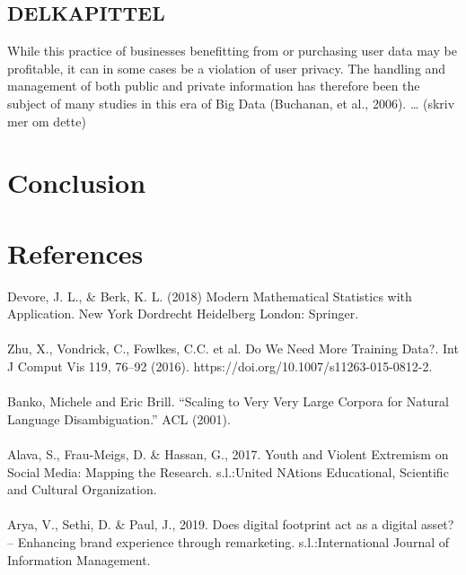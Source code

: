 \documentclass[11pt]{article}
\begin{document}
\subsection{DELKAPITTEL}
While this practice of businesses benefitting from or purchasing user data may be profitable, it can in some cases be a violation of user privacy. The handling and management of both public and private information has therefore been the subject of many studies in this era of Big Data (Buchanan, et al., 2006).  … (skriv mer om dette) 

\section{Conclusion}



%
%

\section{References}
Devore, J. L., \& Berk, K. L. (2018) Modern Mathematical Statistics with Application. New York Dordrecht Heidelberg London: Springer.\\ \\

Zhu, X., Vondrick, C., Fowlkes, C.C. et al. Do We Need More Training Data?. Int J Comput Vis 119, 76–92 (2016). https://doi.org/10.1007/s11263-015-0812-2. \\ \\

Banko, Michele and Eric Brill. “Scaling to Very Very Large Corpora for Natural Language Disambiguation.” ACL (2001).\\ \\

Alava, S., Frau-Meigs, D. \& Hassan, G., 2017. Youth and Violent Extremism on Social Media: Mapping the Research. s.l.:United NAtions Educational, Scientific and Cultural Organization.\\ \\

Arya, V., Sethi, D. \& Paul, J., 2019. Does digital footprint act as a digital asset? – Enhancing brand experience through remarketing. s.l.:International Journal of Information Management. \\ 
\end{document}

